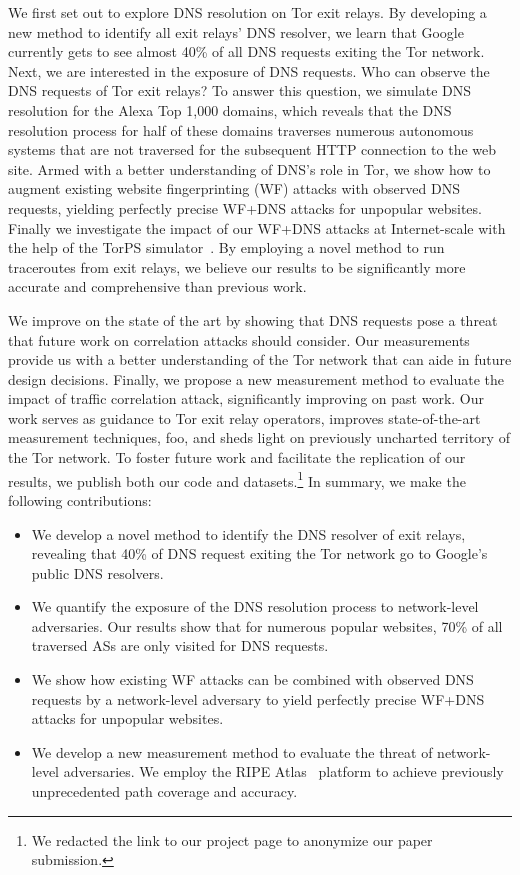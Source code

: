 We first set out to explore DNS resolution on Tor exit relays.  By developing a
new method to identify all exit relays' DNS resolver, we learn that Google
currently gets to see almost 40\% of all DNS requests exiting the Tor network.
Next, we are interested in the exposure of DNS requests.  Who can observe the
DNS requests of Tor exit relays?  To answer this question, we simulate DNS
resolution for the Alexa Top 1,000 domains, which reveals that the DNS
resolution process for half of these domains traverses numerous autonomous
systems that are not traversed for the subsequent HTTP connection to the web
site.  Armed with a better understanding of DNS's role in Tor, we show how to
augment existing website fingerprinting (WF) attacks with observed DNS requests,
yielding perfectly precise WF+DNS attacks for unpopular websites.
Finally we investigate the impact of our WF+DNS attacks at Internet-scale
with the help of the TorPS simulator~\cite{TorPS}.
By employing a novel method to run traceroutes from
exit relays, we believe our results to be significantly more accurate and
comprehensive than previous work.

We improve on the state of the art by showing that DNS requests pose a threat
that future work on correlation attacks should consider.  Our measurements
provide us with a better understanding of the Tor network that can aide in
future design decisions.  Finally, we propose a new measurement method to
evaluate the impact of traffic correlation attack, significantly improving on
past work.  Our work \first serves as guidance to Tor exit relay operators,
\second improves state-of-the-art measurement techniques, \third foo, \fourth
and sheds light on previously uncharted territory of the Tor network.  To
foster future work and facilitate the replication of our results, we publish
both our code and datasets.\footnote{We redacted the link to our project page to
anonymize our paper submission.} In summary, we make the following
contributions:
\begin{itemize}
	\item We develop a novel method to identify the DNS resolver of exit relays,
		revealing that 40\% of DNS request exiting the Tor network go to
		Google's public DNS resolvers.

	\item We quantify the exposure of the DNS resolution process to
		network-level adversaries.  Our results show that for numerous popular
		websites, 70\% of all traversed ASs are only visited for DNS requests.

	\item We show how existing WF attacks can be combined with observed DNS
	requests by a network-level adversary to yield perfectly precise
	WF+DNS attacks for unpopular websites.

	\item We develop a new measurement method to evaluate the threat of
		network-level adversaries. We employ the RIPE Atlas~\cite{atlas}
		platform to achieve previously unprecedented path coverage and accuracy.
\end{itemize}

